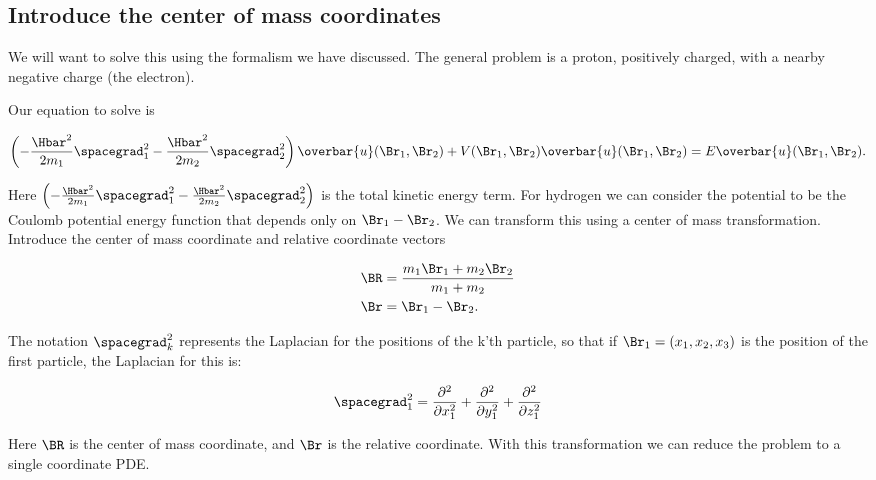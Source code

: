 %
%

\subsection{Introduce the center of mass coordinates}

We will want to solve this using the formalism we have discussed.  The general problem is a proton, positively charged, with a nearby negative charge (the electron).

Our equation to solve is

\begin{align}\label{eqn:PHY356Lecture10:50}
\left(
-\frac{\Hbar^2}{2 m_1} \spacegrad_1^2
-\frac{\Hbar^2}{2 m_2} \spacegrad_2^2
\right)
\overbar{u}(\Br_1, \Br_2) +
V(\Br_1, \Br_2)
\overbar{u}(\Br_1, \Br_2)
=
E \overbar{u}(\Br_1, \Br_2).
\end{align}

Here $\left( -\frac{\Hbar^2}{2 m_1} \spacegrad_1^2 -\frac{\Hbar^2}{2 m_2} \spacegrad_2^2 \right)$ is the total kinetic energy term.
For hydrogen we can consider the potential to be the Coulomb potential energy function that depends only on $\Br_1 - \Br_2$.  We can transform this using a center of mass transformation.  Introduce the center of mass coordinate and relative coordinate vectors

\begin{align}\label{eqn:PHY356Lecture10:51}
\BR &= \frac{m_1 \Br_1 + m_2 \Br_2}{ m_1 + m_2 } \\
\Br &= \Br_1 - \Br_2.
\end{align}

The notation $\spacegrad_k^2$ represents the Laplacian for the positions of the k'th particle, so that if $\Br_1 = (x_1, x_2, x_3)$ is the position of the first particle, the Laplacian for this is:

\begin{equation}\label{eqn:PHY356FLecture10:52}
\spacegrad_1^2
=
\frac{\partial^2}{\partial x_1^2}
+\frac{\partial^2}{\partial y_1^2}
+\frac{\partial^2}{\partial z_1^2}
\end{equation}

Here $\BR$ is the center of mass coordinate, and $\Br$ is the relative coordinate.  With this transformation we can reduce the problem to a single coordinate PDE.

